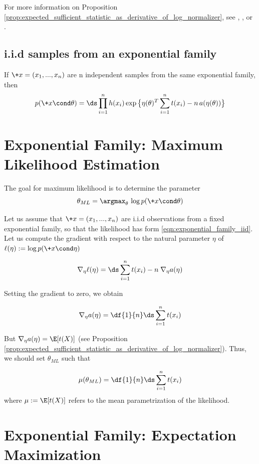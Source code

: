 \documentclass{article} %
\begin{document}
For more information on Proposition \ref{prop:expected_sufficient_statistic_as_derivative_of_log_normalizer}, see \cite{jordan_ef}, \cite{nielsen2010entropies}, or \cite{nielsen2010entropies}.   

\subsection{i.i.d samples from an exponential family}
If $\+x=(x_1, ..., x_n)$ are n independent samples from the same exponential family, then 
\begin{align}
\label{eqn:exponential_family_iid}
 p(\+x \cond \theta) = \ds\prod_{i=1}^n h(x_i) \exp \big\{ \eta(\theta)^T \sum_{i=1}^n t(x_i) - n \,a(\eta(\theta))\big\} 
 \end{align}

\section{Exponential Family: Maximum Likelihood Estimation} \label{sec:ml_with_ef}

The goal for maximum likelihood is to determine the parameter
\begin{equation}
\label{eqn:ml}
\theta_{ML} = \argmax_\theta  \, \log p(\+x \cond \theta) 
\end{equation}

Let us assume that $\+x=(x_1, ..., x_n)$ are i.i.d observations  from a fixed exponential family, so that the likelihood has form \eqref{eqn:exponential_family_iid}.  Let us compute the gradient with respect to the natural parameter $\eta$ of $\ell(\eta) := \log p(\+x \cond \eta)$

\[ \nabla_\eta \ell(\eta) = \ds\sum_{i=1}^n t(x_i) - n \; \nabla_\eta a(\eta) \]

Setting the gradient to zero, we obtain

\[ \nabla_\eta a(\eta) = \df{1}{n}  \ds\sum_{i=1}^n t(x_i) \]

But $\nabla_\eta a(\eta) = \E [t(X)]$  (see Proposition \ref{prop:expected_sufficient_statistic_as_derivative_of_log_normalizer}).  Thus, we should set $\theta_{ML}$ such that

\[ \mu(\theta_{ML}) = \df{1}{n} \ds\sum_{i=1}^n t(x_i) \]
where $\mu := \E[t(X)]$ refers to the mean parametrization of the likelihood. 

 \section{Exponential Family: Expectation Maximization} \label{sec:em_with_ef}
\end{document}
